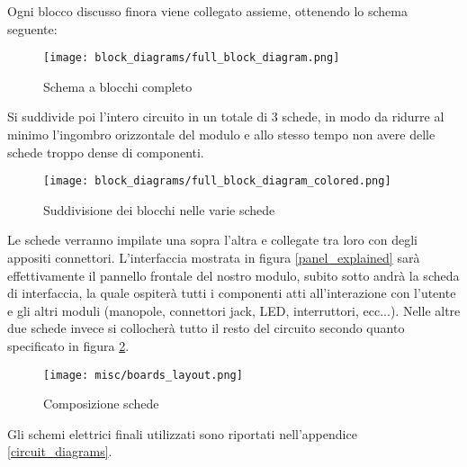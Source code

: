 



Ogni blocco discusso finora viene collegato assieme, ottenendo lo schema seguente:

\begin{figure}[H]
    \centering
    \texttt{[image: block\_diagrams/full\_block\_diagram.png]}
    \caption{Schema a blocchi completo}
    \label{full_block_diagram}
\end{figure}

Si suddivide poi l'intero circuito in un totale di 3 schede, in modo da ridurre al minimo
l'ingombro orizzontale del modulo e allo stesso tempo non avere delle schede troppo dense
di componenti.

\begin{figure}[H]
    \centering
    \texttt{[image: block\_diagrams/full\_block\_diagram\_colored.png]}
    \caption{Suddivisione dei blocchi nelle varie schede}
    \label{full_block_diagram_colored}
\end{figure}

Le schede verranno impilate una sopra l'altra e collegate tra loro con degli appositi connettori.
L'interfaccia mostrata in figura \ref{panel_explained} sarà effettivamente il pannello
frontale del nostro modulo, subito sotto andrà la scheda di interfaccia, la quale ospiterà
tutti i componenti atti all'interazione con l'utente e gli altri moduli (manopole, connettori
jack, LED, interruttori, ecc...). Nelle altre due schede invece si collocherà tutto il resto
del circuito secondo quanto specificato in figura \ref{full_block_diagram_colored}.

\begin{figure}[H]
    \centering
    \texttt{[image: misc/boards\_layout.png]}
    \caption{Composizione schede}
    \label{boards_layout}
\end{figure}

Gli schemi elettrici finali utilizzati sono riportati nell'appendice \ref{circuit_diagrams}.



